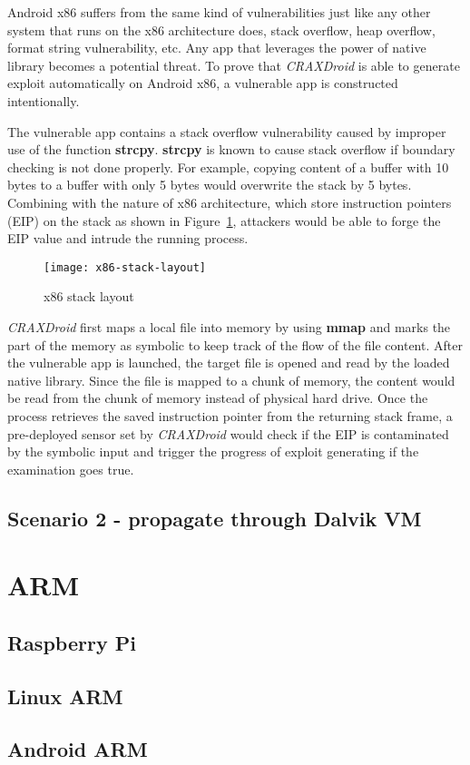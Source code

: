 Android x86 suffers from the same kind of vulnerabilities just like any other
system that runs on the x86 architecture does, stack overflow, heap overflow,
format string vulnerability, etc. Any app that leverages the power of native
library becomes a potential threat. To prove that \emph{CRAXDroid} is able to
generate exploit automatically on Android x86, a vulnerable app is constructed
intentionally.

The vulnerable app contains a stack overflow vulnerability caused by improper
use of the function \textbf{strcpy}. \textbf{strcpy} is known to cause
stack overflow if boundary checking is not done properly. For example, copying
content of a buffer with 10 bytes to a buffer with only 5 bytes would overwrite
the stack by 5 bytes. Combining with the nature of x86 architecture, which
store instruction pointers (EIP) on the stack as shown in
Figure~\ref{fig:x86-stack-layout}, attackers would be able to forge the EIP
value and intrude the running process.

\begin{figure}[!ht]
  \texttt{[image: x86-stack-layout]}
  \caption{x86 stack layout}
  \label{fig:x86-stack-layout}
\end{figure}

\emph{CRAXDroid} first maps a local file into memory by using \textbf{mmap} and
marks the part of the memory as symbolic to keep track of the flow of the file
content. After the vulnerable app is launched, the target file is opened and
read by the loaded native library. Since the file is mapped to a chunk of
memory, the content would be read from the chunk of memory instead of physical
hard drive. Once the process retrieves the saved instruction pointer from the
returning stack frame, a pre-deployed sensor set by \emph{CRAXDroid} would
check if the EIP is contaminated by the symbolic input and trigger the
progress of exploit generating if the examination goes true.

\subsection{Scenario 2 - propagate through Dalvik VM}

\section{ARM}
\subsection{Raspberry Pi}
\subsection{Linux ARM}
\subsection{Android ARM}

